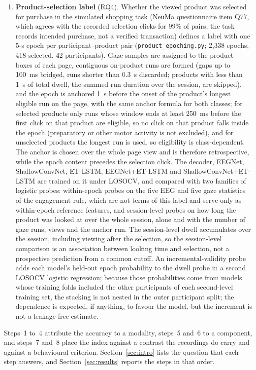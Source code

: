 \documentclass[pdflatex,sn-basic,Numbered,twocolumn,iicol]{sn-jnl}
\theoremstyle{thmstyleone}%
\theoremstyle{thmstyletwo}%
\theoremstyle{thmstylethree}%
\begin{document}
\begin{enumerate}
\item \textbf{Product-selection label} (RQ4). Whether the viewed product was selected for purchase in the simulated shopping task (NeuMa questionnaire item Q77, which agrees with the recorded selection clicks for 99\% of pairs; the task records intended purchase, not a verified transaction) defines a label with one 5-s epoch per participant--product pair (\texttt{product\_epoching.py}; 2{,}338 epochs, 418 selected, 42 participants). Gaze samples are assigned to the product boxes of each page, contiguous on-product runs are formed (gaps up to 100~ms bridged, runs shorter than 0.3~s discarded; products with less than 1~s of total dwell, the summed run duration over the session, are skipped), and the epoch is anchored 1~s before the onset of the product's longest eligible run on the page, with the same anchor formula for both classes; for selected products only runs whose window ends at least 250~ms before the first click on that product are eligible, so no click on that product falls inside the epoch (preparatory or other motor activity is not excluded), and for unselected products the longest run is used, so eligibility is class-dependent. The anchor is chosen over the whole page view and is therefore retrospective, while the epoch content precedes the selection click. The decoder, EEGNet, ShallowConvNet, ET-LSTM, EEGNet+ET-LSTM and ShallowConvNet+ET-LSTM are trained on it under LOSOCV, and compared with two families of logistic probes: within-epoch probes on the five EEG and five gaze statistics of the engagement rule, which are not terms of this label and serve only as within-epoch reference features, and session-level probes on how long the product was looked at over the whole session, alone and with the number of gaze runs, views and the anchor run. The session-level dwell accumulates over the session, including viewing after the selection, so the session-level comparison is an association between looking time and selection, not a prospective prediction from a common cutoff. An incremental-validity probe adds each model's held-out epoch probability to the dwell probe in a second LOSOCV logistic regression; because those probabilities come from models whose training folds included the other participants of each second-level training set, the stacking is not nested in the outer participant split; the dependence is expected, if anything, to favour the model, but the increment is not a leakage-free estimate.
\end{enumerate}

Steps~1 to~4 attribute the accuracy to a modality, steps~5 and~6 to a component, and steps~7 and~8 place the index against a contrast the recordings do carry and against a behavioural criterion. Section~\ref{sec:intro} lists the question that each step answers, and Section~\ref{sec:results} reports the steps in that order.
\end{document}
